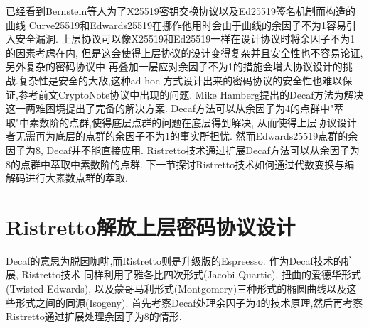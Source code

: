 \documentclass{article}
\begin{document}
已经看到Bernstein等人为了X25519密钥交换协议以及Ed25519签名机制而构造的曲线
Curve25519和Edwards25519在挪作他用时会由于曲线的余因子不为1容易引入安全漏洞.
上层协议可以像X25519和Ed25519一样在设计协议时将余因子不为1的因素考虑在内,
但是这会使得上层协议的设计变得复杂并且安全性也不容易论证,另外复杂的密码协议中
再叠加一层应对余因子不为1的措施会增大协议设计的挑战.复杂性是安全的大敌,这种ad-hoc
方式设计出来的密码协议的安全性也难以保证,参考前文CryptoNote协议中出现的问题.
Mike Hamberg提出的Decaf方法为解决这一两难困境提出了完备的解决方案.
Decaf方法可以从余因子为4的点群中"萃取"中素数阶的点群,使得底层点群的问题在底层得到解决,
从而使得上层协议设计者无需再为底层的点群的余因子不为1的事实所担忧.
然而Edwards25519点群的余因子为8, Decaf并不能直接应用.
Ristretto技术通过扩展Decaf方法可以从余因子为8的点群中萃取中素数阶的点群.
下一节探讨Ristretto技术如何通过代数变换与编解码进行大素数点群的萃取.

\section{Ristretto解放上层密码协议设计}

Decaf的意思为脱因咖啡,而Ristretto则是升级版的Espreesso. 作为Decaf技术的扩展, Ristretto技术
同样利用了雅各比四次形式(Jacobi Quartic), 扭曲的爱德华形式(Twisted Edwards),
以及蒙哥马利形式(Montgomery)三种形式的椭圆曲线以及这些形式之间的同源(Isogeny).
首先考察Decaf处理余因子为4的技术原理,然后再考察Ristretto通过扩展处理余因子为8的情形.
\end{document}
